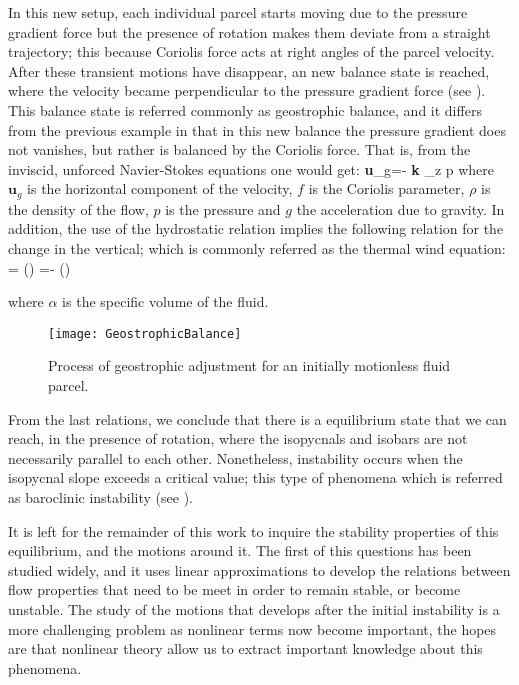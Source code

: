 In this new setup, each individual parcel starts moving due to the
pressure gradient force but the presence of rotation makes them deviate
from a straight trajectory; this because Coriolis force acts at right
angles of the parcel velocity. After these transient motions have
disappear, an new balance state is reached, where the velocity became
perpendicular to the pressure gradient force (see ).
This balance state is referred commonly as geostrophic balance, and it
differs from the previous example in that in this new balance the
pressure gradient does not vanishes, but rather is balanced by the
Coriolis force. That is, from the inviscid, unforced Navier-Stokes
equations one would get:
\beq
\textbf{u}_g=- \textbf{k} \times \nabla_z p
where $\textbf{u}_g$ is the horizontal component of the velocity, $f$ is
the Coriolis parameter, $\rho$ is the density of the flow, $p$ is the
pressure and $g$ the acceleration due to gravity. In addition, the use of
the hydrostatic relation implies the following relation for the change in
the vertical; which is commonly referred as the thermal wind equation:
\beq
{} = \left(\right)
\beq
{} =- \left(\right)

where $\alpha$ is the specific volume of the fluid.
\begin{figure}
\begin{center}
  \texttt{[image: GeostrophicBalance]}\\
\end{center}
  \caption{Process of geostrophic adjustment for an initially motionless fluid parcel.}
  \label{f:GBalance}
\end{figure}

From the last relations, we conclude that there is a equilibrium state
that we can reach, in the presence of rotation, where the isopycnals and
isobars are not necessarily parallel to each other. Nonetheless,
instability occurs when the isopycnal slope exceeds a critical value;
this type of phenomena which is referred as baroclinic instability (see
).

It is left for the remainder of this work to inquire the stability
properties of this equilibrium, and the motions around it. The first of
this questions has been studied widely, and it uses linear approximations
to develop the relations between flow properties that need to be meet in
order to remain stable, or become unstable. The study of the motions that
develops after the initial instability is a more challenging problem as
nonlinear terms now become important, the hopes are that nonlinear theory
allow us to extract important knowledge about this phenomena.

